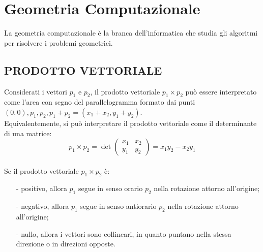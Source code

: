 \documentclass[12pt,a4paper]{report}
\begin{document}
\section{Geometria Computazionale}
La geometria computazionale è la branca dell'informatica che studia gli algoritmi per risolvere i problemi geometrici.

\subsection*{\small{PRODOTTO VETTORIALE}}
Considerati i vettori $p_1$ e $p_2$, il prodotto vettoriale $p_1 \times p_2$ può essere interpretato come l'area con segno del parallelogramma formato dai punti $(0, 0), p_1, p_2, p_1 + p_2 = (x_1 + x_2, y_1 + y_2)$.\\
Equivalentemente, si può interpretare il prodotto vettoriale come il determinante di una matrice:
\[
p_1 \times p_2 = \det\begin{pmatrix}
                    x_1 & x_2\\ 
                    y_1 & y_2 
                    \end{pmatrix}
= x_1y_2 - x_2y_1
\]\\
Se il prodotto vettoriale $p_1 \times p_2$ è:
\begin{itemize}
    \item[-] positivo, allora $p_1$ segue in senso orario $p_2$ nella rotazione attorno all'origine;
    \item[-] negativo, allora $p_1$ segue in senso antiorario $p_2$ nella rotazione attorno all'origine;
    \item[-] nullo, allora i vettori sono collineari, in quanto puntano nella stessa direzione o in direzioni opposte.
\end{itemize}
\end{document}
